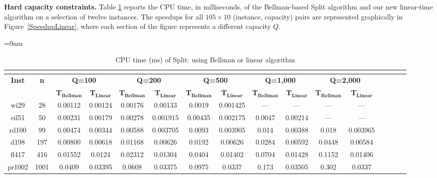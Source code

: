 \documentclass[11pt]{article}
\newcommand{\setmuskip}[2]{#1=#2\relax}
\begin{document}
\textbf{Hard capacity constraints.}
Table \ref{Table-Linear} reports the CPU time, in milliseconds, of the Bellman-based Split algorithm and our new linear-time algorithm on a selection of twelve instances. The speedups for all $105 \times 10$ (instance, capacity) pairs are represented graphically in Figure~\ref{SpeedupLinear}, where each section of the figure represents a different capacity $Q$.

\begin{table}[p]
\begingroup
\setmuskip{\medmuskip}{0mu}
\renewcommand{\arraystretch}{1.1}
\caption{CPU time (ms) of Split: using Bellman or linear algorithm} \label{Table-Linear}
\hspace*{-1.45cm}
\scalebox{0.77}
{
\setlength{\tabcolsep}{1.6mm}
\begin{tabular}{|cc|cc|cc|cc|cc|cc|cc|cc}
\multicolumn{12}{c}{\vspace*{-0.5cm}}\\
\hline
\multirow{2}{*}{\textbf{Inst}}&\multirow{2}{*}{\textbf{n}}&\multicolumn{2}{c|}{\textbf{Q=100}}&\multicolumn{2}{c|}{\textbf{Q=200}}&\multicolumn{2}{c|}{\textbf{Q=500}}&\multicolumn{2}{c|}{\textbf{Q=1,000}}&\multicolumn{2}{c|}{\textbf{Q=2,000}}\\
&&\textbf{T$_\textbf{Bellman}$}&\textbf{T$_\textbf{Linear}$}&\textbf{T$_\textbf{Bellman}$}&\textbf{T$_\textbf{Linear}$}&\textbf{T$_\textbf{Bellman}$}&\textbf{T$_\textbf{Linear}$}&\textbf{T$_\textbf{Bellman}$}&\textbf{T$_\textbf{Linear}$}&\textbf{T$_\textbf{Bellman}$}&\textbf{T$_\textbf{Linear}$}\\
\hline
wi29&28&\num{0.00112}&\num{0.00124}&\num{0.00176}&\num{0.00133}&\num{0.0019}&\num{0.001425}&---&---&---&---\\
eil51&50&\num{0.00231}&\num{0.00179}&\num{0.00278}&\num{0.001915}&\num{0.00435}&\num{0.002175}&\num{0.0047}&\num{0.00214}&---&---\\
rd100&99&\num{0.00474}&\num{0.00344}&\num{0.00588}&\num{0.003705}&\num{0.0093}&\num{0.003905}&\num{0.014}&\num{0.00388}&\num{0.018}&\num{0.003965}\\
d198&197&\num{0.00800}&\num{0.00618}&\num{0.01168}&\num{0.00626}&\num{0.0192}&\num{0.00626}&\num{0.0284}&\num{0.00592}&\num{0.0448}&\num{0.00584}\\
fl417&416&\num{0.01552}&\num{0.0124}&\num{0.02312}&\num{0.01304}&\num{0.0404}&\num{0.01402}&\num{0.0704}&\num{0.01428}&\num{0.1152}&\num{0.01406}\\
pr1002&1001&\num{0.0409}&\num{0.03395}&\num{0.0608}&\num{0.03375}&\num{0.0975}&\num{0.0337}&\num{0.173}&\num{0.03505}&\num{0.302}&\num{0.0337}\\

\end{tabular}}
\end{table}
\end{document}
